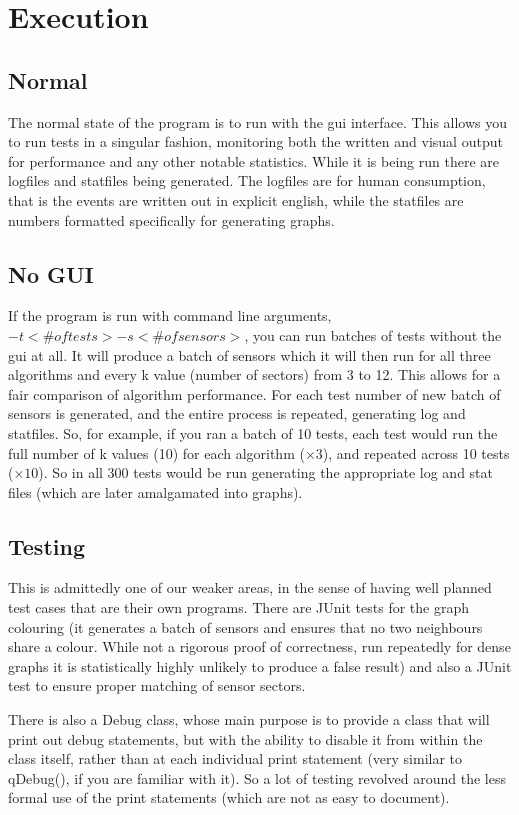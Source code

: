 \section{Execution}

\subsection{Normal}
The normal state of the program is to run with the gui interface. This allows you to run tests in a singular fashion, monitoring both the written and visual output for performance and any other notable statistics. While it is being run there are logfiles and statfiles being generated. The logfiles are for human consumption, that is the events are written out in explicit english, while the statfiles are numbers formatted specifically for generating graphs.

\subsection{No GUI}
If the program is run with command line arguments, $-t < \# of tests> -s <\# of sensors>$, you 
can run batches of tests without the gui at all. It will produce a batch of sensors which it 
will then run for all three algorithms and every k value (number of sectors) from 3 to 12. 
This allows for a fair comparison of algorithm performance. For each test number of new batch 
of sensors is generated, and the entire process is repeated, generating log and statfiles. So, 
for example, if you ran a batch of 10 tests, each test would run the full number of k values 
(10) for each algorithm ($\times 3$), and repeated across 10 tests ($\times 10$). So in all 300 
tests would be run generating the appropriate log and stat files (which are later amalgamated 
into graphs).

\subsection{Testing}
This is admittedly one of our weaker areas, in the sense of having well planned test cases 
that are their own programs. There are JUnit tests for the graph colouring (it generates a 
batch of sensors and ensures that no two neighbours share a colour. While not a rigorous proof 
of correctness, run repeatedly for dense graphs it is statistically highly unlikely to produce 
a false result) and also a JUnit test to ensure proper matching of sensor sectors. 

There is also a Debug class, whose main purpose is to provide a class that will print out 
debug statements, but with the ability to disable it from within the class itself, rather than 
at each individual print statement (very similar to qDebug(), if you are familiar with it). So 
a lot of testing revolved around the less formal use of the print statements (which are not as 
easy to document).